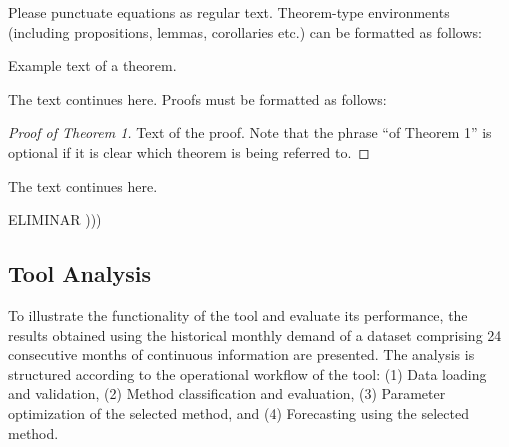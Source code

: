 \documentclass[journal,article,submit,pdftex,moreauthors]{Definitions/mdpi}
\begin{document}

Please punctuate equations as regular text. Theorem-type environments (including propositions, lemmas, corollaries etc.) can be formatted as follows:
\begin{Theorem}
Example text of a theorem.
\end{Theorem}

The text continues here. Proofs must be formatted as follows:

\begin{proof}[Proof of Theorem 1]
Text of the proof. Note that the phrase ``of Theorem 1'' is optional if it is clear which theorem is being referred to.
\end{proof}
The text continues here.


ELIMINAR )))

\subsection{Tool Analysis}
To illustrate the functionality of the tool and evaluate its performance, the results obtained using the historical monthly demand of a dataset comprising 24 consecutive months of continuous information are presented. The analysis is structured according to the operational workflow of the tool: (1) Data loading and validation, (2) Method classification and evaluation, (3) Parameter optimization of the selected method, and (4) Forecasting using the selected method.
\end{document}
